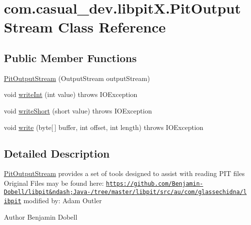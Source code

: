 \hypertarget{classcom_1_1casual__dev_1_1libpit_x_1_1_pit_output_stream}{\section{com.\-casual\-\_\-dev.\-libpit\-X.\-Pit\-Output\-Stream Class Reference}
\label{classcom_1_1casual__dev_1_1libpit_x_1_1_pit_output_stream}
}
\subsection*{Public Member Functions}
\begin{DoxyCompactItemize}
\item 
\hyperlink{classcom_1_1casual__dev_1_1libpit_x_1_1_pit_output_stream_a7c3f262a5f0d7b76fccffbba7e0afff0}{Pit\-Output\-Stream} (Output\-Stream output\-Stream)
\item 
void \hyperlink{classcom_1_1casual__dev_1_1libpit_x_1_1_pit_output_stream_a094d01007eb76a2e312957b2d2870585}{write\-Int} (int value)  throws I\-O\-Exception 
\item 
void \hyperlink{classcom_1_1casual__dev_1_1libpit_x_1_1_pit_output_stream_af4474cce8b6b608319637e90952cd47f}{write\-Short} (short value)  throws I\-O\-Exception 
\item 
void \hyperlink{classcom_1_1casual__dev_1_1libpit_x_1_1_pit_output_stream_acb35ed536a973095da6c442c763b9953}{write} (byte\mbox{[}$\,$\mbox{]} buffer, int offset, int length)  throws I\-O\-Exception 
\end{DoxyCompactItemize}


\subsection{Detailed Description}
\hyperlink{classcom_1_1casual__dev_1_1libpit_x_1_1_pit_output_stream}{Pit\-Output\-Stream} provides a set of tools designed to assist with reading P\-I\-T files Original Files may be found here\-: \href{https://github.com/Benjamin-Dobell/libpit&ndash;Java-/tree/master/libpit/src/au/com/glassechidna/libpit}{\tt https\-://github.\-com/\-Benjamin-\/\-Dobell/libpit\&ndash;\-Java-\//tree/master/libpit/src/au/com/glassechidna/libpit} modified by\-: Adam Outler

\begin{DoxyAuthor}{Author}
Benjamin Dobell 
\end{DoxyAuthor}


